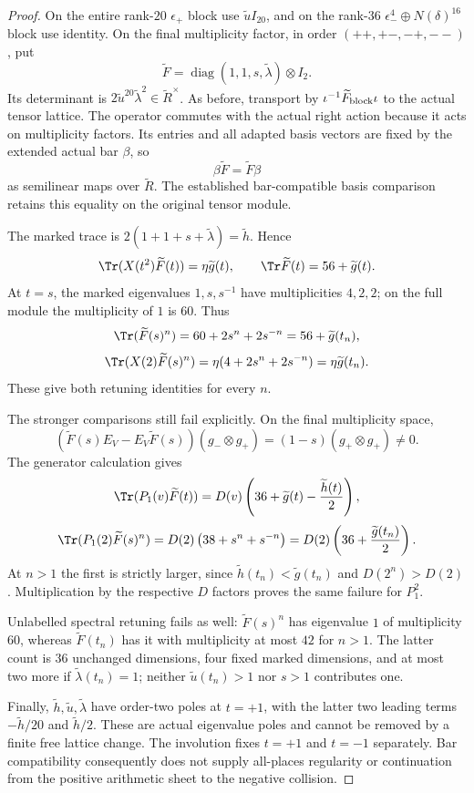 \begin{proof}
On the entire rank-$20$ $\epsilon_+$ block use
$\widetilde u I_{20}$, and on the rank-$36$
$\epsilon_-^4\oplus N(\delta)^{16}$ block use identity.
On the final multiplicity factor, in order
$(++,+-,-+,--)$, put
\[
 \widetilde F
   =\operatorname{diag}(1,1,s,\widetilde\lambda)\otimes I_2.
\]
Its determinant is
$2\widetilde u^{20}\widetilde\lambda^2\in\widetilde R^\times$.
As before, transport by
$\iota^{-1}\widetilde F_{\rm block}\iota$ to the
actual tensor lattice.
The operator commutes with the actual right action
because it acts on multiplicity factors.
Its entries and all adapted basis vectors are fixed
by the extended actual bar $\beta$, so
\[
 \beta\widetilde F=\widetilde F\beta
\]
as semilinear maps over $\widetilde R$.
The established bar-compatible basis comparison
retains this equality on the original tensor module.

The marked trace is
$2(1+1+s+\widetilde\lambda)=\widetilde h$.
Hence
\begin{equation}\label{eq:barfractionaltraces}
 \Tr(X(t^2)\widetilde F(t))=\eta\widetilde g(t),\qquad
 \Tr\widetilde F(t)=56+\widetilde g(t).
\end{equation}
At $t=s$, the marked eigenvalues $1,s,s^{-1}$
have multiplicities $4,2,2$; on the full module
the multiplicity of $1$ is $60$.
Thus
\[
 \Tr(\widetilde F(s)^n)
       =60+2s^n+2s^{-n}=56+\widetilde g(t_n),
\]
\[
 \Tr(X(2)\widetilde F(s)^n)
       =\eta(4+2s^n+2s^{-n})=\eta\widetilde g(t_n).
\]
These give both retuning identities for every $n$.

The stronger comparisons still fail explicitly.
On the final multiplicity space,
\[
 (\widetilde F(s)E_V-E_V\widetilde F(s))
       (g_-\otimes g_+)
  =(1-s)(g_+\otimes g_+)\ne0.
\]
The generator calculation gives
\[
 \Tr(P_1(v)\widetilde F(t))
    =D(v)\left(36+\widetilde g(t)
                         -\frac{\widetilde h(t)}2\right),
\]
\[
 \Tr(P_1(2)\widetilde F(s)^n)
    =D(2)\left(38+s^n+s^{-n}\right)
    =D(2)\left(36+\frac{\widetilde g(t_n)}2\right).
\]
At $n>1$ the first is strictly larger, since
$\widetilde h(t_n)<\widetilde g(t_n)$ and $D(2^n)>D(2)$.
Multiplication by the respective $D$ factors proves
the same failure for $P_1^2$.

Unlabelled spectral retuning fails as well:
$\widetilde F(s)^n$ has eigenvalue $1$ of multiplicity
$60$, whereas $\widetilde F(t_n)$ has it with
multiplicity at most $42$ for $n>1$.
The latter count is $36$ unchanged dimensions,
four fixed marked dimensions, and at most two more
if $\widetilde\lambda(t_n)=1$; neither
$\widetilde u(t_n)>1$ nor $s>1$ contributes one.

Finally, $\widetilde h,\widetilde u,
\widetilde\lambda$ have order-two poles at $t=+1$,
with the latter two leading terms
$-\widetilde h/20$ and $\widetilde h/2$.
These are actual eigenvalue poles and cannot be
removed by a finite free lattice change.
The involution fixes $t=+1$ and $t=-1$ separately.
Bar compatibility consequently does not supply
all-places regularity or continuation from the
positive arithmetic sheet to the negative collision.
\end{proof}

